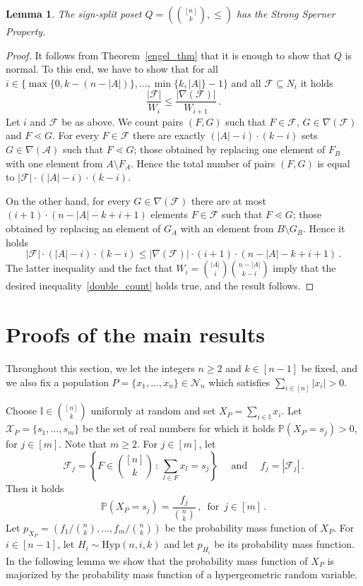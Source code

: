 \documentclass[11pt]{article}
\newtheorem{lemma}{Lemma}
\newcommand{\Prb}{\mathbb{P}}
\begin{document}
\begin{lemma}\label{obs2}
The sign-split poset $Q=(\binom{[n]}{k}, \le)$ has the Strong Sperner Property. 
\end{lemma}
\begin{proof}
It follows from Theorem~\ref{engel_thm} that it is enough to show that $Q$ is normal. To this end, we have to show that 
for all $i \in \{\max\{0,k-(n-|A|)\}, \ldots, \min\{k,|A|\}-1\}$ and all $\mathcal{F}\subseteq N_i$ it holds 
\begin{equation}\label{double_count}
\frac{|\mathcal{F}|}{W_i}\le \frac{|\nabla(\mathcal{F})|}{W_{i+1}} \, .
\end{equation}
Let $i$ and $\mathcal{F}$ be as above. We count pairs 
$(F,G)$ such that $F\in \mathcal{F}$, $G\in\nabla(\mathcal{F})$ and $F\lessdot G$. 
For every $F\in \mathcal{F}$ there are exactly $(|A|-i)\cdot (k-i)$ sets $G\in\nabla(\mathcal{A})$ such that $F\lessdot G$; those obtained by replacing one element of $F_B$ with one element from $A\setminus F_A$. 
Hence the total number of pairs $(F,G)$ is equal to 
$|\mathcal{F}|\cdot (|A|-i)\cdot (k-i)$. 

On the other hand, for every $G\in\nabla(\mathcal{F})$ there are at most $(i+1)\cdot (n-|A|-k+i+1)$ elements $F\in\mathcal{F}$ such that $F\lessdot G$; those obtained by replacing an element of $G_A$ with an element from $B\setminus G_B$. 
Hence it holds 
\[
|\mathcal{F}|\cdot (|A|-i)\cdot (k-i) \le |\nabla(\mathcal{F})|\cdot (i+1)\cdot (n-|A|-k+i+1) \, .
\]
The latter inequality  and  the fact that $W_i=\binom{|A|}{i}\binom{n-|A|}{k-i}$ imply that the desired inequality~\eqref{double_count} holds true, and  the result follows. 
\end{proof}



\section{Proofs of the main results}
\label{proof_of_main_thm}

Throughout this section, we let the integers $n\ge 2$ and $k\in [n-1]$ be fixed, and we also fix a population 
$P=\{x_1,\ldots,x_n\}\in\mathcal{N}_n$ which satisfies  
$\sum_{i\in [n]}|x_i|>0$. 

Choose $\mathbb{I}\in\binom{[n]}{k}$ uniformly at random and set $X_P = \sum_{i\in\mathbb{I}}x_i$. 
Let $\mathcal{X}_P=\{s_1,\ldots,s_m\}$ be the set of real numbers for which it holds $\Prb(X_P=s_j)>0$, for $j\in [m]$.  Note that $m\ge 2$. 
For $j\in [m]$, let 
\[
\mathcal{F}_j = \left\{F\in \binom{[n]}{k} \,:\, \sum_{l\in F}x_l = s_j \right\} \quad \text{ and }\quad f_j = |\mathcal{F}_j| \, . 
\]
Then it holds 
\[
\Prb(X_P = s_j) = \frac{f_j}{\binom{n}{k}} \, , \,\text{ for } \, j \in [m] \, .
\]
Let $p_{X_P} = (f_1/\binom{n}{k},\ldots, f_m/\binom{n}{k})$ be the probability mass function of $X_P$.  
For $i\in [n-1]$, let $H_i\sim\text{Hyp}(n,i,k)$ and 
let $p_{H_i}$ be its probability mass function.  
In the following lemma we show that the probability mass function of $X_P$ is majorized by the probability mass function of a hypergeometric random variable. 
\end{document}
